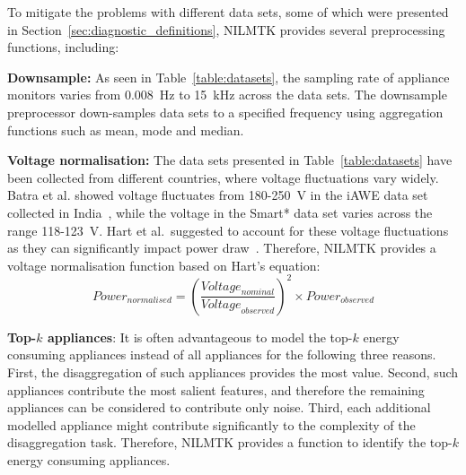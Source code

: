 \documentclass{sig-alternate}
\newcommand{\redcolor}[1]{\textcolor{red}{#1}}
\newcommand{\secref}[1]{Section~\ref{#1}}
\newcommand{\tabref}[1]{Table~\ref{#1}}
\begin{document}
\noindent
To mitigate the problems  with different data sets, some of which were presented in \secref{sec:diagnostic_definitions}, NILMTK provides several preprocessing functions, including:

\textbf{Downsample:} As seen in \tabref{table:datasets}, the sampling rate of appliance monitors varies
from 0.008~Hz to 15~kHz across the data sets. The downsample preprocessor down-samples data sets to a specified frequency using aggregation functions such as mean, mode and median.

\textbf{Voltage normalisation:} The data sets presented in \tabref{table:datasets} have been
collected from different countries, where voltage fluctuations vary
widely. Batra et al. showed voltage fluctuates from 180-250~V in the
iAWE data set collected in India~\cite{iawe}, while the voltage in the
Smart* data set varies across the range 118-123~V. Hart et al.\ suggested to account for these voltage fluctuations as they can
significantly impact power draw~\cite{hart_1992}. Therefore, NILMTK
provides a voltage normalisation function based on Hart's equation:
\begin{equation}
\textit{Power}_{\textit{normalised}} = 
\left(\frac{\textit{Voltage}_{\textit{nominal}}}{\textit{Voltage}_{\textit{observed}}}\right)^2 
\times \textit{Power}_{\textit{observed}}
\end{equation}

\textbf{Top-$k$ appliances}: It is often advantageous to model the top-$k$ energy consuming appliances instead of all appliances for the following three reasons. 
First, the disaggregation of such appliances provides the most value. Second, such appliances contribute the most salient features, and therefore the remaining appliances can be considered to contribute only noise. Third, each additional modelled appliance might contribute significantly to the complexity of the disaggregation task. Therefore, NILMTK provides a function to identify the top-$k$ energy consuming appliances.

\end{document}
